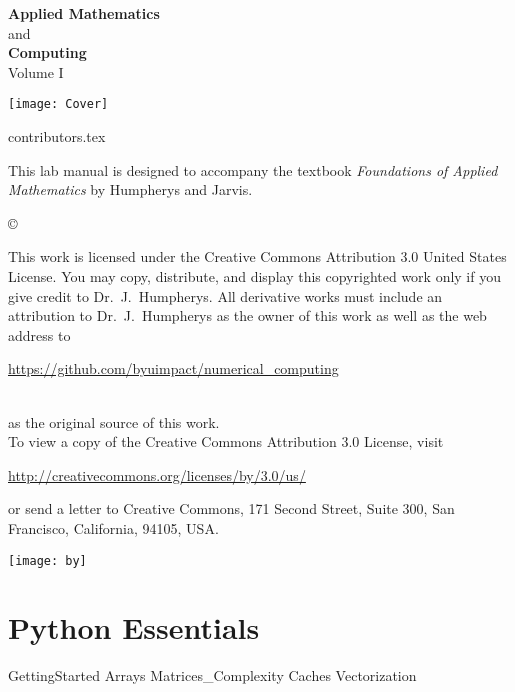 \documentclass[nociteref]{newsiambook}
\begin{document}



\thispagestyle{empty}
\begin{center}
{\huge \bf Applied Mathematics} \\ and \\ {\huge \bf Computing} \\
\vspace{5mm}
{\Large Volume I}
\vspace{20mm}

\texttt{[image: Cover]}
\end{center}
\frontmatter

{contributors.tex}


\begin{thepreface}
This lab manual is designed to accompany the textbook \emph{Foundations of Applied Mathematics} by Humpherys and Jarvis.

\vfill
\copyright{This work is licensed under the Creative Commons Attribution 3.0 United States 
License.  You may copy, distribute, and display this copyrighted work only if you give 
credit to Dr.~J.~Humpherys. All derivative works must include an attribution to Dr.~J.~Humpherys as the owner of this work as well as the web address to 
\\\centerline{\url{https://github.com/byuimpact/numerical_computing}}\\ as the original source of 
this 
work.\\To view a copy of the Creative Commons Attribution 3.0 License, 
visit\\\centerline{\url{http://creativecommons.org/licenses/by/3.0/us/}} or send a letter to 
Creative Commons, 171 Second Street, Suite 300, San Francisco, California, 94105, USA.}

\vfill
\centering\texttt{[image: by]}
\vfill
\end{thepreface}

\setcounter{tocdepth}{1}
\tableofcontents

\mainmatter

\part{Python Essentials}
{GettingStarted}
{Arrays}
{Matrices_Complexity}
{Caches}
{Vectorization}
\end{document}
